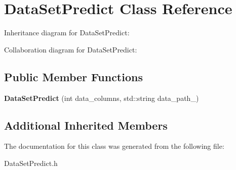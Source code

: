 \hypertarget{classDataSetPredict}{}\section{Data\+Set\+Predict Class Reference}
\label{classDataSetPredict}


Inheritance diagram for Data\+Set\+Predict\+:


Collaboration diagram for Data\+Set\+Predict\+:
\subsection*{Public Member Functions}
\begin{DoxyCompactItemize}
\item 
\mbox{\label{classDataSetPredict_aa76514fc9a3d14a8905f8e717863f9db}} 
{\bfseries Data\+Set\+Predict} (int data\+\_\+columns, std\+::string data\+\_\+path\+\_\+)
\end{DoxyCompactItemize}
\subsection*{Additional Inherited Members}


The documentation for this class was generated from the following file\+:\begin{DoxyCompactItemize}
\item 
Data\+Set\+Predict.\+h\end{DoxyCompactItemize}
